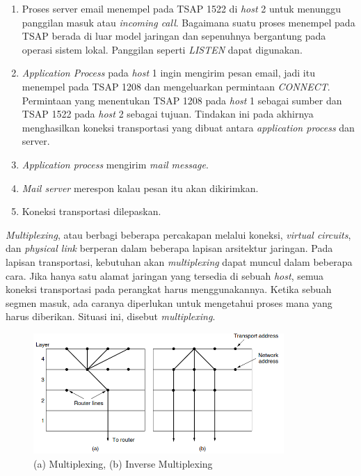 \begin{enumerate}
  \item{Proses server email menempel pada TSAP 1522 di \emph{host} 2 untuk menunggu panggilan masuk atau \emph{incoming call}. Bagaimana suatu proses menempel pada TSAP berada di luar model jaringan dan sepenuhnya bergantung pada operasi sistem lokal. Panggilan seperti \emph{LISTEN} dapat digunakan.}

  \item{\emph{Application Process} pada \emph{host} 1 ingin mengirim pesan email, jadi itu menempel pada TSAP 1208 dan mengeluarkan permintaan \emph{CONNECT}. Permintaan yang menentukan TSAP 1208 pada \emph{host} 1 sebagai sumber dan TSAP 1522 pada \emph{host} 2 sebagai tujuan. Tindakan ini pada akhirnya menghasilkan koneksi transportasi yang dibuat antara \emph{application process} dan server.}

  \item{\emph{Application process} mengirim \emph{mail message}.}

  \item{\emph{Mail server} merespon kalau pesan itu akan dikirimkan.}

  \item{Koneksi transportasi dilepaskan.}
\end{enumerate}

\emph{Multiplexing}, atau berbagi beberapa percakapan melalui koneksi, \emph{virtual circuits}, dan \emph{physical link} berperan dalam beberapa lapisan arsitektur jaringan. Pada lapisan transportasi, kebutuhan akan \emph{multiplexing} dapat muncul dalam beberapa cara. Jika hanya satu alamat jaringan yang tersedia di sebuah \emph{host}, semua koneksi transportasi pada perangkat harus menggunakannya. Ketika sebuah segmen masuk, ada caranya diperlukan untuk mengetahui proses mana yang harus diberikan. Situasi ini, disebut \emph{multiplexing}.

\begin{figure}[H]
  \centering{}
	\includegraphics[width=0.85\textwidth]{gambar/multiplexing}
  \caption{(a) Multiplexing, (b) Inverse Multiplexing}
\end{figure}


